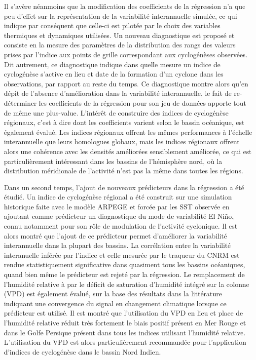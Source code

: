 \documentclass[../main.tex]{subfiles}
\begin{document}
Il s'avère néanmoins que la modification des coefficients de la régression n'a que peu d'effet sur la représentation de la variabilité interannuelle simulée, ce
qui indique par conséquent que celle-ci est pilotée par le choix des variables thermiques et dynamiques utilisées. Un nouveau diagnostique est proposé et
consiste en la mesure des paramètres de la distribution des rangs des valeurs prises par l'indice aux points de grille correspondant aux cyclogénèses observées.
Dit autrement, ce diagnostique indique dans quelle mesure un indice de cyclogénèse s'active en lieu et date de la formation d'un cyclone dans les observations,
par rapport au reste du temps. Ce diagnostique montre alors qu'en dépit de l'absence d'amélioration dans la variabilité interannuelle, le fait de re-déterminer
les coefficients de la régression pour son jeu de données apporte tout de même une plus-value. L'intérêt de construire des indices de cyclogénèse régionaux,
c'est à dire dont les coefficients varient selon le bassin océanique, est également évalué. Les indices régionaux offrent les mêmes performances à l'échelle
interannuelle que leurs homologues globaux, mais les indices régionaux offrent alors une cohérence avec les densités améliorées sensiblement améliorée, ce qui
est particulièrement intéressant dans les bassins de l'hémisphère nord, où la distribution méridionale de l'activité n'est pas la même dans toutes les régions.

Dans un second temps, l'ajout de nouveaux prédicteurs dans la régression a été étudié. Un indice de cyclogénèse régional a été construit sur une simulation
historique faite avec le modèle ARPEGE et forcée par les SST observée en ajoutant comme prédicteur un diagnostique du mode de variabilité El Niño, connu
notamment pour son rôle de modulation de l'activité cyclonique. Il est alors montré que l'ajout de ce prédicteur permet d'améliorer la variabilité interannuelle
dans la plupart des bassins. La corrélation entre la variabilité interanuelle inférée par l'indice et celle mesurée par le traqueur du CNRM est rendue
statistiquement significative dans quasiment tous les bassins océaniques, quand bien même le prédicteur est rejeté par la régression. Le remplacement de
l'humidité relative à  par le déficit de saturation d'humidité intégré sur la colonne (VPD) est également évalué, sur la base des résultats dans la
littérature indiquant une convergence du signal en changement climatique lorsque ce prédicteur est utilisé. Il est montré que l'utilisation du VPD en lieu et
place de l'humidité relative réduit très fortement le biais positif présent en Mer Rouge et dans le Golfe Persique présent dans tous les indices utilisant
l'humidité relative. L'utilisation du VPD est alors particulièrement recommandée pour l'application d'indices de cyclogénèse dans le bassin Nord Indien.
\end{document}
